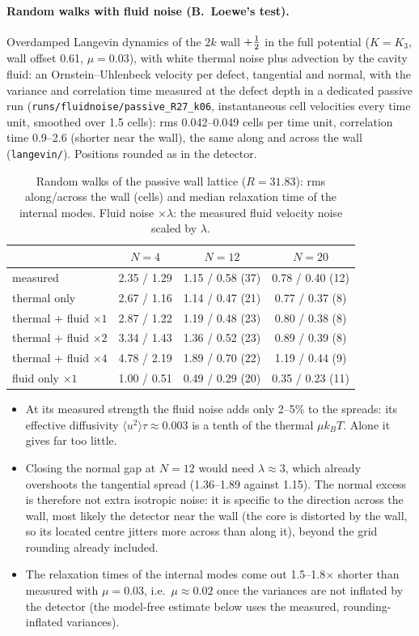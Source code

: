 \paragraph{Random walks with fluid noise (B.~Loewe's test).} Overdamped Langevin dynamics of the $2k$ wall $+\tfrac12$ in the full potential
($K=K_3$, wall offset 0.61, $\mu=0.03$), with white thermal noise plus advection by the cavity fluid: an Ornstein--Uhlenbeck velocity per defect,
tangential and normal, with the variance and correlation time measured at the defect depth in a dedicated passive run
(\texttt{runs/fluidnoise/passive\_R27\_k06}, instantaneous cell velocities every time unit, smoothed over 1.5 cells): rms 0.042--0.049 cells per
time unit, correlation time 0.9--2.6 (shorter near the wall), the same along and across the wall (\texttt{langevin/}). Positions rounded as in
the detector.
\begin{table}[H]\centering\small
\caption{Random walks of the passive wall lattice ($R=31.83$): rms along/across the wall (cells) and median relaxation time of the internal modes.
Fluid noise $\times\lambda$: the measured fluid velocity noise scaled by $\lambda$.}\label{tab:langevin}
\begin{tabular}{lccc}\toprule
& $N=4$ & $N=12$ & $N=20$\\\midrule
measured & 2.35 / 1.29 & 1.15 / 0.58 (37) & 0.78 / 0.40 (12)\\
thermal only & 2.67 / 1.16 & 1.14 / 0.47 (21) & 0.77 / 0.37 (8)\\
thermal + fluid $\times1$ & 2.87 / 1.22 & 1.19 / 0.48 (23) & 0.80 / 0.38 (8)\\
thermal + fluid $\times2$ & 3.34 / 1.43 & 1.36 / 0.52 (23) & 0.89 / 0.39 (8)\\
thermal + fluid $\times4$ & 4.78 / 2.19 & 1.89 / 0.70 (22) & 1.19 / 0.44 (9)\\
fluid only $\times1$ & 1.00 / 0.51 & 0.49 / 0.29 (20) & 0.35 / 0.23 (11)\\\bottomrule
\end{tabular}
\end{table}
\begin{itemize}
  \item At its measured strength the fluid noise adds only 2--5\% to the spreads: its effective diffusivity
        $\langle u^2\rangle\tau\approx0.003$ is a tenth of the thermal $\mu k_BT$. Alone it gives far too little.
  \item Closing the normal gap at $N=12$ would need $\lambda\approx3$, which already overshoots the tangential spread (1.36--1.89 against 1.15).
        The normal excess is therefore not extra isotropic noise: it is specific to the direction across the wall, most likely the detector near the wall
        (the core is distorted by the wall, so its located centre jitters more across than along it), beyond the grid rounding already included.
  \item The relaxation times of the internal modes come out 1.5--1.8$\times$ shorter than measured with $\mu=0.03$, i.e.\ $\mu\approx0.02$ once the
        variances are not inflated by the detector (the model-free estimate below uses the measured, rounding-inflated variances).
\end{itemize}

